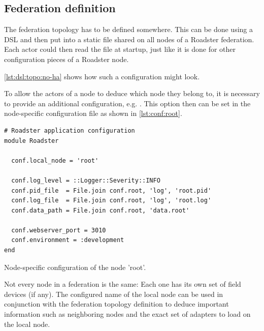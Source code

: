 \subsection{Federation definition}
The federation topology has to be defined somewhere. This can be done using a
\gls{DSL} and then put into a static file shared
on all nodes of a Roadster federation. Each actor could then read the file at
startup, just like it is done for other configuration pieces of a Roadster node.

\autoref{lst:dsl:topo:no-ha} shows how such a configuration might look.

To allow the actors of a node to deduce which node they belong to, it is
necessary to provide an additional configuration, e.g. .
This option then can be set in the node-specific configuration file as shown in
\autoref{lst:conf:root}.

\begin{listing}
	\begin{verbatim}
# Roadster application configuration
module Roadster

  conf.local_node = 'root'

  conf.log_level = ::Logger::Severity::INFO
  conf.pid_file  = File.join conf.root, 'log', 'root.pid'
  conf.log_file  = File.join conf.root, 'log', 'root.log'
  conf.data_path = File.join conf.root, 'data.root'

  conf.webserver_port = 3010
  conf.environment = :development
end
	\end{verbatim}
	\caption{Node-specific configuration of the node 'root'.}
	\label{lst:conf:root}
\end{listing}

Not every node in a federation is the same: Each one has its own set of field devices (if any).
The configured name of the local node can be used in conjunction with the
federation topology definition to deduce important information such as neighboring
nodes and the exact set of adapters to load on the local node.

